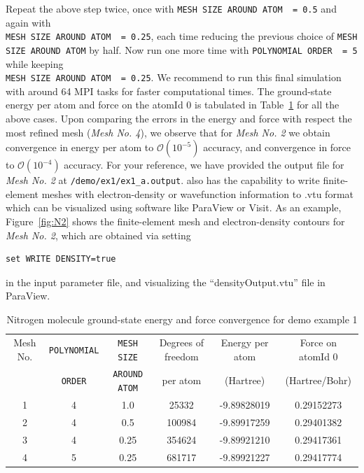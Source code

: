 \begin{enumerate}
Repeat the above step twice, once with \verb|MESH SIZE AROUND ATOM  = 0.5| and again with\\ \verb|MESH SIZE AROUND ATOM  = 0.25|, each time reducing the previous choice of \verb|MESH SIZE AROUND ATOM| by half. Now run one more time with \verb|POLYNOMIAL ORDER  = 5| while keeping \\ \verb|MESH SIZE AROUND ATOM  = 0.25|. We recommend to run this final simulation with around 64 MPI tasks for faster computational times. The ground-state energy per atom and force on the atomId 0 is tabulated in Table~\ref{tab:table1} for all the above cases. Upon comparing the errors in the energy and force with respect the most refined mesh (\emph{Mesh No. 4}), we observe that for \emph{Mesh No. 2} we obtain convergence in energy per atom to $\mathcal{O}(10^{-5})$ accuracy, and convergence in force to $\mathcal{O}(10^{-4})$ accuracy. For your reference, we have provided the output file for \emph{Mesh No. 2} at \verb|/demo/ex1/ex1_a.output|. \dftfe{} also has the capability to write finite-element meshes with electron-density or wavefunction information to .vtu format which can be visualized using software like ParaView or Visit. As an example, Figure~\ref{fig:N2} shows the finite-element mesh and electron-density contours for \emph{Mesh No. 2}, which are obtained via setting
\begin{verbatim}
set WRITE DENSITY=true
\end{verbatim}
in the input parameter file, and visualizing the ``densityOutput.vtu'' file in ParaView.
\begin{table}[h!]
  \begin{center}
\small	  
    \caption{Nitrogen molecule ground-state energy and force convergence for demo example 1}
    \label{tab:table1}
    \begin{tabular}{c|c|c|c|c|c}
	    \hline\hline
	    Mesh No. &\verb|POLYNOMIAL| &\verb|MESH SIZE| & Degrees of freedom& Energy per atom & Force on atomId 0\\
	    &\verb|ORDER| &\verb|AROUND ATOM| & per atom  & (Hartree) & (Hartree/Bohr) \\
      \hline\hline
	    1& 4 & 1.0 & 25332 & -9.89828019 &  0.29152273\\
	    2&4 & 0.5 & 100984 & -9.89917259 & 0.29401382\\
	    3&4 & 0.25 & 354624 & -9.89921210 & 0.29417361\\
	    4&5 & 0.25 & 681717 & -9.89921227 & 0.29417774\\
	    \hline\hline
    \end{tabular}
  \end{center}
\end{table}


\end{enumerate}
